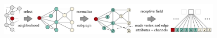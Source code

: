 \begin{figure}[h]
  \centering
  \includegraphics[width=.9\textwidth]{images/normalization}
\end{figure}
